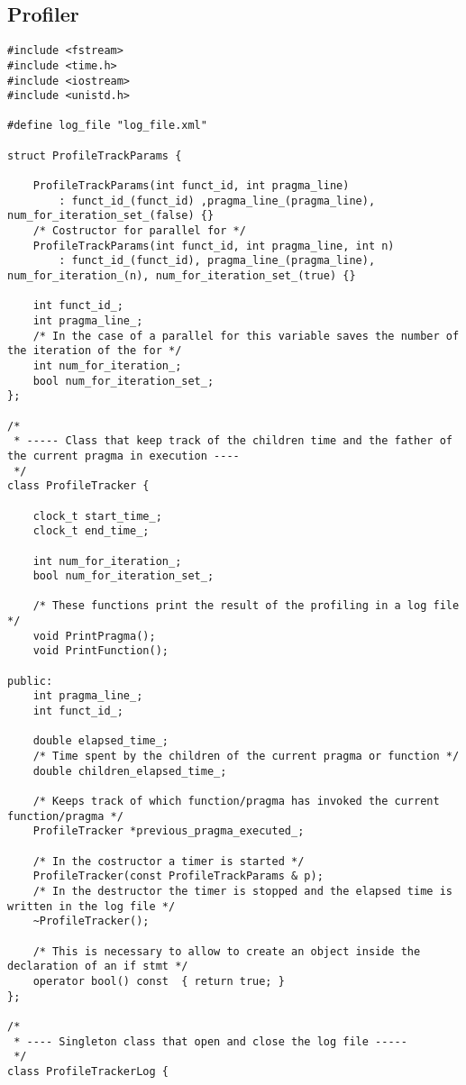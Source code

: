 \documentclass[a4paper,10pt,twoside]{book}
\begin{document}
\subsection{Profiler}
\begin{lstlisting}[language=CCC, caption=profile\_tracker.h]
#include <fstream>
#include <time.h>     
#include <iostream>
#include <unistd.h>

#define log_file "log_file.xml"

struct ProfileTrackParams {

	ProfileTrackParams(int funct_id, int pragma_line)
		: funct_id_(funct_id) ,pragma_line_(pragma_line), num_for_iteration_set_(false) {}
	/* Costructor for parallel for */
	ProfileTrackParams(int funct_id, int pragma_line, int n) 
		: funct_id_(funct_id), pragma_line_(pragma_line), num_for_iteration_(n), num_for_iteration_set_(true) {}

	int funct_id_; 
	int pragma_line_;
	/* In the case of a parallel for this variable saves the number of the iteration of the for */
	int num_for_iteration_;
	bool num_for_iteration_set_;
};

/*
 * ----- Class that keep track of the children time and the father of the current pragma in execution ----
 */
class ProfileTracker {

	clock_t start_time_;
	clock_t end_time_;

	int num_for_iteration_;
	bool num_for_iteration_set_;

	/* These functions print the result of the profiling in a log file */
	void PrintPragma();
	void PrintFunction();

public:
	int pragma_line_;
	int funct_id_;

	double elapsed_time_;
	/* Time spent by the children of the current pragma or function */
	double children_elapsed_time_;

	/* Keeps track of which function/pragma has invoked the current function/pragma */
	ProfileTracker *previous_pragma_executed_;

	/* In the costructor a timer is started */
	ProfileTracker(const ProfileTrackParams & p);
	/* In the destructor the timer is stopped and the elapsed time is written in the log file */
	~ProfileTracker();

	/* This is necessary to allow to create an object inside the declaration of an if stmt */
	operator bool() const  { return true; }
};

/*
 * ---- Singleton class that open and close the log file -----
 */
class ProfileTrackerLog {


\end{lstlisting}
\end{document}
